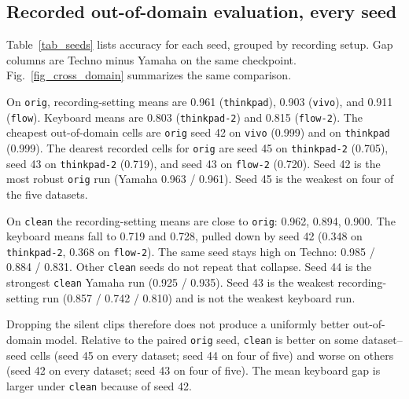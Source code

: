 \documentclass[pdflatex,sn-mathphys-num,iicol]{sn-jnl}
\begin{document}
\subsection{Recorded out-of-domain evaluation, every seed}\label{subsec_res_recorded}

Table~\ref{tab_seeds} lists accuracy for each seed, grouped by recording setup. Gap columns are Techno minus Yamaha on the same checkpoint. Fig.~\ref{fig_cross_domain} summarizes the same comparison.

On \texttt{orig}, recording-setting means are 0.961 (\texttt{thinkpad}), 0.903 (\texttt{vivo}), and 0.911 (\texttt{flow}). Keyboard means are 0.803 (\texttt{thinkpad-2}) and 0.815 (\texttt{flow-2}). The cheapest out-of-domain cells are \texttt{orig} seed 42 on \texttt{vivo} (0.999) and on \texttt{thinkpad} (0.999). The dearest recorded cells for \texttt{orig} are seed 45 on \texttt{thinkpad-2} (0.705), seed 43 on \texttt{thinkpad-2} (0.719), and seed 43 on \texttt{flow-2} (0.720). Seed 42 is the most robust \texttt{orig} run (Yamaha 0.963 / 0.961). Seed 45 is the weakest on four of the five datasets.

On \texttt{clean} the recording-setting means are close to \texttt{orig}: 0.962, 0.894, 0.900. The keyboard means fall to 0.719 and 0.728, pulled down by seed 42 (0.348 on \texttt{thinkpad-2}, 0.368 on \texttt{flow-2}). The same seed stays high on Techno: 0.985 / 0.884 / 0.831. Other \texttt{clean} seeds do not repeat that collapse. Seed 44 is the strongest \texttt{clean} Yamaha run (0.925 / 0.935). Seed 43 is the weakest recording-setting run (0.857 / 0.742 / 0.810) and is not the weakest keyboard run.

Dropping the silent clips therefore does not produce a uniformly better out-of-domain model. Relative to the paired \texttt{orig} seed, \texttt{clean} is better on some dataset--seed cells (seed 45 on every dataset; seed 44 on four of five) and worse on others (seed 42 on every dataset; seed 43 on four of five). The mean keyboard gap is larger under \texttt{clean} because of seed 42.
\end{document}
